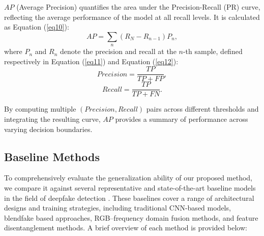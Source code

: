 \documentclass[final,5p,times]{elsarticle}
\begin{document}
$AP$ (Average Precision) quantifies the area under the Precision-Recall (PR) curve, reflecting the average performance of the model at all recall levels. It is calculated as Equation (\ref{eq10}):
\begin{equation} \label{eq10}
AP=\sum_n(R_N-R_{n-1})P_n,
\end{equation}
where $P_n$ and $R_n$ denote the precision and recall at the $n$-th sample, defined respectively in Equation (\ref{eq11}) and Equation (\ref{eq12}):
\begin{equation} \label{eq11}
Precision=\frac{TP}{TP+FP},
\end{equation}
\begin{equation} \label{eq12}
Recall=\frac{TP}{TP+FN}.
\end{equation}

By computing multiple $(Precision, Recall)$ pairs across different thresholds and integrating the resulting curve, $AP$ provides a summary of performance across varying decision boundaries.

\subsection{Baseline Methods}

To comprehensively evaluate the generalization ability of our proposed method, we compare it against several representative and state-of-the-art baseline models in the field of deepfake detection \cite{10,18,25,28}. These baselines cover a range of architectural designs and training strategies, including traditional CNN-based models, blendfake based approaches, RGB–frequency domain fusion methods, and feature disentanglement methods. A brief overview of each method is provided below:
\end{document}
